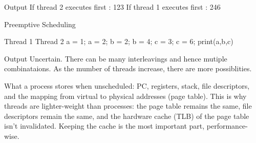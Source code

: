 \documentclass[twoside]{article}
\begin{document}
Output\newline
If thread 2 executes first : 123\newline
If thread 1 executes first : 246\newline


Preemptive Scheduling \newline

 Thread 1 \hspace{30 mm}                   	Thread 2 \newline
  a = 1;  \hspace{36 mm}                       a = 2;  \newline
  b = 2;  \hspace{36 mm}                       b = 4;  \newline
  c =  3; \hspace{36 mm}                       c  = 6;  \newline
 print(a,b,c)\newline
 
Output \newline
Uncertain. There can be many interleavings and hence mutiple combinataions. As the mumber of threads increase, there are more possiblities. \newline

What a process stores when unscheduled: PC, registers, stack, file descriptors, and the mapping from virtual to physical addresses (page table). This is why threads are lighter-weight than processes: the page table remains the same, file descriptors remain the same, and the hardware cache (TLB) of the page table isn't invalidated. Keeping the cache is the most important part, performance-wise.
\end{document}
